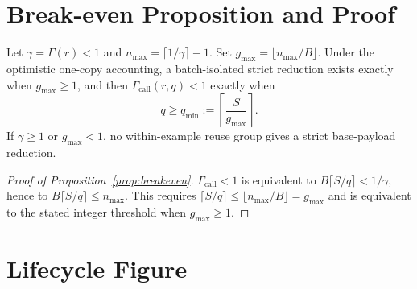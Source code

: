 \section{Break-even Proposition and Proof}
\label{app:breakeven}

\begin{proposition}\label{prop:breakeven}
Let $\gamma=\Gamma(r)<1$ and
$n_{\max}=\lceil1/\gamma\rceil-1$.  Set
$g_{\max}=\lfloor n_{\max}/B\rfloor$.  Under the optimistic one-copy
accounting, a batch-isolated strict reduction exists exactly when
$g_{\max}\ge1$, and then $\Gamma_{\mathrm{call}}(r,q)<1$ exactly when
\begin{equation}
q\ge q_{\min}:=
\left\lceil\frac{S}{g_{\max}}\right\rceil.
\end{equation}
If $\gamma\ge1$ or $g_{\max}<1$, no within-example reuse group gives a
strict base-payload reduction.
\end{proposition}
\begin{proof}[Proof of Proposition~\ref{prop:breakeven}]
$\Gamma_{\mathrm{call}}<1$ is equivalent to
$B\lceil S/q\rceil<1/\gamma$, hence to
$B\lceil S/q\rceil\le n_{\max}$.  This requires
$\lceil S/q\rceil\le\lfloor n_{\max}/B\rfloor=g_{\max}$ and is equivalent to
the stated integer threshold when $g_{\max}\ge1$.
\end{proof}

\section{Lifecycle Figure}
\label{app:lifecycle}

